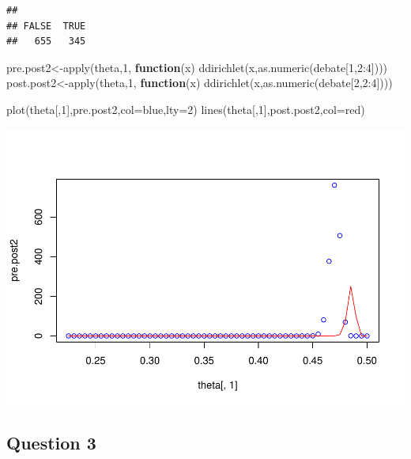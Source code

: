 \documentclass[
]{book}
\newenvironment{Shaded}{\begin{snugshade}}{\end{snugshade}}
\newcommand{\AttributeTok}[1]{\textcolor[rgb]{0.77,0.63,0.00}{#1}}
\newcommand{\ControlFlowTok}[1]{\textcolor[rgb]{0.13,0.29,0.53}{\textbf{#1}}}
\newcommand{\DecValTok}[1]{\textcolor[rgb]{0.00,0.00,0.81}{#1}}
\newcommand{\FunctionTok}[1]{\textcolor[rgb]{0.00,0.00,0.00}{#1}}
\newcommand{\NormalTok}[1]{#1}
\newcommand{\OtherTok}[1]{\textcolor[rgb]{0.56,0.35,0.01}{#1}}
\newcommand{\SpecialCharTok}[1]{\textcolor[rgb]{0.00,0.00,0.00}{#1}}
\newcommand{\StringTok}[1]{\textcolor[rgb]{0.31,0.60,0.02}{#1}}
\theoremstyle{definition}
\theoremstyle{definition}
\theoremstyle{definition}
\theoremstyle{definition}
\theoremstyle{remark}
\begin{document}
\begin{verbatim}
## 
## FALSE  TRUE 
##   655   345
\end{verbatim}

\begin{Shaded}
\begin{Highlighting}[]
\NormalTok{ pre.post2}\OtherTok{\textless{}{-}}\FunctionTok{apply}\NormalTok{(theta,}\DecValTok{1}\NormalTok{, }\ControlFlowTok{function}\NormalTok{(x) }\FunctionTok{ddirichlet}\NormalTok{(x,}\FunctionTok{as.numeric}\NormalTok{(debate[}\DecValTok{1}\NormalTok{,}\DecValTok{2}\SpecialCharTok{:}\DecValTok{4}\NormalTok{])))}
\NormalTok{ post.post2}\OtherTok{\textless{}{-}}\FunctionTok{apply}\NormalTok{(theta,}\DecValTok{1}\NormalTok{, }\ControlFlowTok{function}\NormalTok{(x) }\FunctionTok{ddirichlet}\NormalTok{(x,}\FunctionTok{as.numeric}\NormalTok{(debate[}\DecValTok{2}\NormalTok{,}\DecValTok{2}\SpecialCharTok{:}\DecValTok{4}\NormalTok{])))}
 
  \FunctionTok{plot}\NormalTok{(theta[,}\DecValTok{1}\NormalTok{],pre.post2,}\AttributeTok{col=}\StringTok{\textquotesingle{}blue\textquotesingle{}}\NormalTok{,}\AttributeTok{lty=}\DecValTok{2}\NormalTok{)}
  \FunctionTok{lines}\NormalTok{(theta[,}\DecValTok{1}\NormalTok{],post.post2,}\AttributeTok{col=}\StringTok{\textquotesingle{}red\textquotesingle{}}\NormalTok{)}
\end{Highlighting}
\end{Shaded}

\includegraphics{_main_files/figure-latex/unnamed-chunk-30-2.pdf}

\hypertarget{question-3-1}{%
\subsection*{Question 3}\label{question-3-1}}
\end{document}
